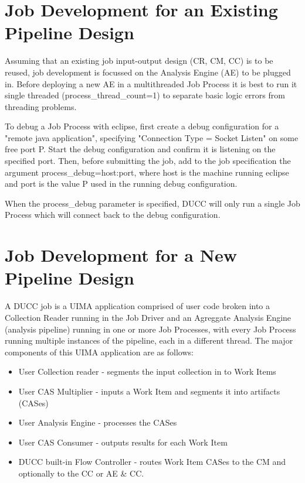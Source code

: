 \section{Job Development for an Existing Pipeline Design}

Assuming that an existing job input-output design (CR, CM, CC) is to be reused, job
development is focussed on the Analysis Engine (AE) to be plugged in. Before deploying a new
AE in a multithreaded Job Process it is best to run it single threaded
(process\_thread\_count=1) to separate basic logic errors from threading
problems.

To debug a Job Process with eclipse, first create a debug configuration for a
"remote java application", specifying "Connection Type = Socket Listen" on some
free port P. Start the debug configuration and confirm it is listening on the specified port.
Then, before submitting the job, add to the job specification the argument
process\_debug=host:port, where host is the machine running eclipse and port is
the value P used in the running debug configuration.

When the process\_debug parameter is specified, DUCC will only run a single Job Process
which will connect back to the debug configuration.


\section{Job Development for a New Pipeline Design}

A DUCC job is a UIMA application comprised of user code broken into a Collection
Reader running in the Job Driver and an Agreggate Analysis Engine (analysis pipeline) running in one 
or more Job Processes, with every Job Process running multiple instances of the pipeline, each in a different
thread. The major components of this UIMA application are as follows:

\begin{itemize}
  \item User Collection reader - segments the input collection in to Work Items
  \item User CAS Multiplier - inputs a Work Item and segments it into artifacts (CASes)
  \item User Analysis Engine - processes the CASes
  \item User CAS Consumer - outputs results for each Work Item
  \item DUCC built-in Flow Controller - routes Work Item CASes to the CM and optionally to the CC or AE \& CC.
\end{itemize}

